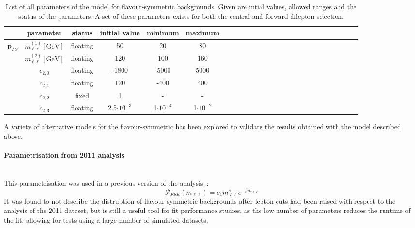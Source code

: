 \begin{table}[htbp]
\begin{center}
 \renewcommand{\arraystretch}{1.3}
 \caption{List of all parameters of the model for flavour-symmetric backgrounds. Given are intial values, allowed ranges and the status of the parameters. A set of these parameters exists for both the central and forward dilepton selection.\label{tab:Fit_Par_Overview_FS}}
\begin{tabular}{l|c|c|c|c|ccccccccccccccccccccc}
& parameter & status & initial value & minimum & maximum \\ \hline
\multirow{5}{*}{$\mathbf{p}_{FS}$} & $m_{\ell\ell}^{(1)} [\mathrm{GeV}]$ & floating & 50 & 20 & 80 \\ 
& $m_{\ell\ell}^{(2)}  [\mathrm{GeV}]$ & floating & 120 & 100 & 160 \\
& $c_{2,0}$ & floating & -1800 & -5000 & 5000 \\ 
& $c_{2,1}$ & floating & 120 & -400 & 400 \\
& $c_{2,2}$ & fixed & 1 & - & - \\
& $c_{2,3}$ & floating & 2.5$\cdot10^{-3}$ & 1$\cdot10^{-4}$ & 1$\cdot10^{-2}$ \\
\end{tabular}

\end{center}
\end{table}

A variety of alternative models for the flavour-symmetric has been explored to validate the results obtained with the model described above. 

\paragraph{Parametrisation from 2011 analysis}\mbox{} \\
This parametrisation was used in a previous version of the analysis~\cite{edge2011}: 
\begin{equation*}
 \mathcal{P}_{FSE}(m_{\ell\ell}) = c_{1} m_{\ell\ell}^{\alpha} e^{-\beta m_{\ell\ell}}
\end{equation*}
It was found to not describe the distrubtion of flavour-symmetric backgrounds after lepton \pt cuts had been raised with respect to the analysis of the 2011 dataset, but is still a useful tool for fit performance studies, as the low number of parameters reduces the runtime of the fit, allowing for tests using a large number of simulated datasets.
